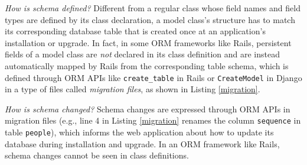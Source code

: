 

\textit{How is schema defined?} Different from a regular class whose 
field names and field types are defined by its class
declaration, a model class's structure has to match its corresponding database table that is created once at an application's installation or upgrade.
In fact, in some ORM frameworks like Rails, persistent fields of a model class are \textit{not} declared in its class
definition and are instead automatically mapped by Rails from the corresponding table schema, which is 
defined through ORM
APIs like \texttt{create\_table} in Rails or
\texttt{CreateModel} in Django in a type of files called
\textit{migration files},
as shown in Listing \ref{migration}. 

\textit{How is schema changed?} 
Schema changes are expressed
through ORM APIs in migration files (e.g., line 4 in Listing 
\ref{migration}
renames the column \texttt{sequence} in table \texttt{people}), 
which informs the web application about how to 
update its database during installation and upgrade.
In an ORM framework like Rails, schema changes cannot be seen in
class definitions.

